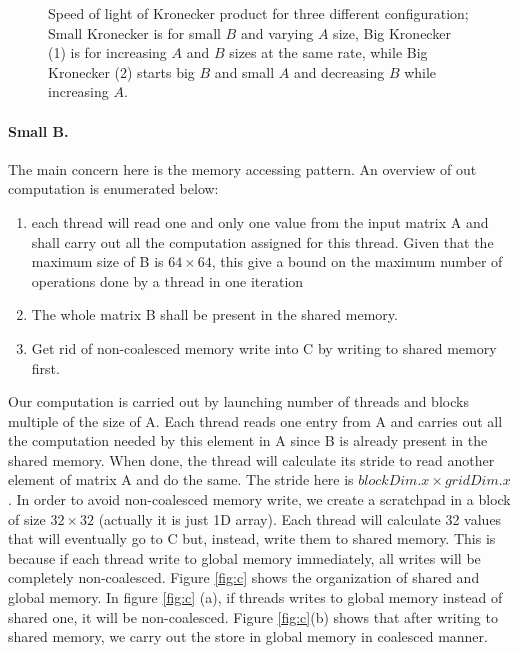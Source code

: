 \documentclass[12pt] {article}
\begin{document}
\begin{figure}[!tbh]
\centering        
   \caption{Speed of light of Kronecker product for three different configuration; Small Kronecker is for small $B$ and varying $A$ size, Big Kronecker (1) is for increasing $A$ and $B$ sizes at the same rate, while Big Kronecker (2) starts big $B$ and small $A$ and decreasing $B$ while increasing $A$.}   
   \label{fig:sol}
\end{figure}

\paragraph{Small B.} The main concern here is the memory accessing pattern. An overview of out computation is enumerated below:
\begin{enumerate}
\item each thread will read one and only one value from the input matrix A and shall carry out all the computation assigned for this thread. Given that the maximum size of B is $64 \times 64$, this give a bound on the maximum number of operations done by a thread in one iteration 
\item The whole matrix B shall be present in the shared memory. 
\item Get rid of non-coalesced memory write into C by writing to shared memory first. 
\end{enumerate}

Our computation is carried out by launching number of threads and blocks multiple of the size of A. Each thread reads one entry from A and carries out all the computation needed by this element in A since B is already present in the shared memory. When done, the thread will calculate its stride to read another element of matrix A and do the same. The stride here is $blockDim.x \times gridDim.x$. In order to avoid non-coalesced memory write, we create a scratchpad in a block of size $32\times 32$ (actually it is just 1D array). Each thread will calculate 32 values that will eventually go to C but, instead, write them to shared memory. This is because if each thread write to global memory immediately, all writes will be completely non-coalesced. Figure \ref{fig:c} shows the organization of shared and global memory. In figure \ref{fig:c} (a), if threads writes to global memory instead of shared one, it will be non-coalesced. Figure \ref{fig:c}(b) shows that after writing to shared memory, we carry out the store in global memory in coalesced manner. 
\end{document}
